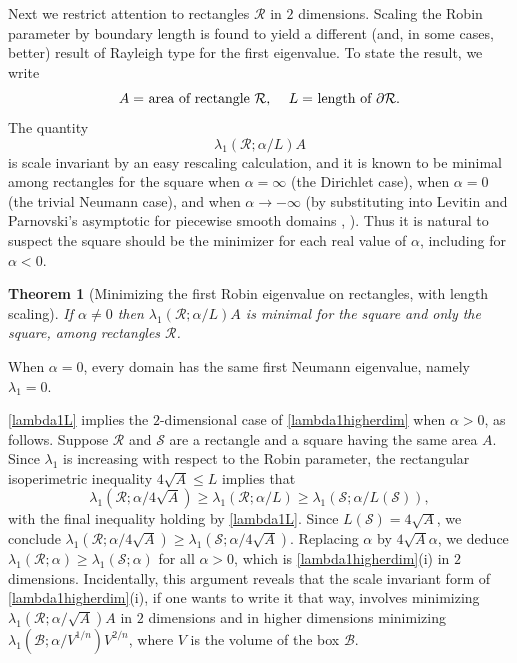 \documentclass[12pt,reqno]{amsart}
\newtheorem{theorem}{Theorem}[section]
\theoremstyle{definition}
\begin{document}
Next we restrict attention to rectangles $\mathcal{R}$ in $2$ dimensions. Scaling the Robin parameter by boundary length is found to yield a different (and, in some cases, better) result of Rayleigh type for the first eigenvalue. To state the result, we write 
\[
\text{$A=$ area of rectangle $\mathcal{R}$, \quad $L=$ length of $\partial \mathcal{R}$.}
\]
The quantity 
\[
\lambda_1(\mathcal{R};\alpha/L)A
\]
is scale invariant by an easy rescaling calculation, and it is known to be minimal among rectangles for the square when $\alpha=\infty$ (the Dirichlet case), when $\alpha=0$ (the trivial Neumann case), and when $\alpha \to -\infty$ (by substituting into Levitin and Parnovski's asymptotic for piecewise smooth domains \cite[Theorem 4.15]{H17},  \cite[{\S}3]{LP08}). Thus it is natural to suspect the square should be the minimizer for each real value of $\alpha$, including for $\alpha<0$. 
%
\begin{theorem}[Minimizing the first Robin eigenvalue on rectangles, with length scaling]\label{lambda1L} If $\alpha \neq 0$ then $\lambda_1(\mathcal{R};\alpha/L)A$ is minimal for the square and only the square, among rectangles $\mathcal{R}$. 
\end{theorem}
%
When $\alpha=0$, every domain has the same first Neumann eigenvalue, namely $\lambda_1=0$.

\autoref{lambda1L} implies the $2$-dimensional case of \autoref{lambda1higherdim} when $\alpha>0$, as follows. Suppose $\mathcal{R}$ and $\mathcal{S}$ are a rectangle and a square having the same area $A$. Since $\lambda_1$ is increasing with respect to the Robin parameter, the rectangular isoperimetric inequality $4\sqrt{A} \leq L$ implies that 
\[
\lambda_1(\mathcal{R};\alpha/4\sqrt{A}) \geq \lambda_1(\mathcal{R};\alpha/L) \geq \lambda_1(\mathcal{S};\alpha/L(\mathcal{S})) ,
\]
with the final inequality holding by \autoref{lambda1L}. Since $L(\mathcal{S})=4\sqrt{A}$, we conclude $\lambda_1(\mathcal{R};\alpha/4\sqrt{A}) \geq \lambda_1(\mathcal{S};\alpha/4\sqrt{A})$. Replacing $\alpha$ by $4\sqrt{A} \alpha$, we deduce $\lambda_1(\mathcal{R};\alpha) \geq \lambda_1(\mathcal{S};\alpha)$ for all $\alpha>0$, which is  \autoref{lambda1higherdim}(i) in $2$ dimensions. Incidentally, this argument reveals that the scale invariant form of \autoref{lambda1higherdim}(i), if one wants to write it that way, involves minimizing $\lambda_1(\mathcal{R};\alpha/\sqrt{A})A$ in $2$ dimensions and in higher dimensions minimizing $\lambda_1(\mathcal{B};\alpha/V^{1/n})V^{2/n}$, where $V$ is the volume of the box $\mathcal{B}$.
\end{document}
